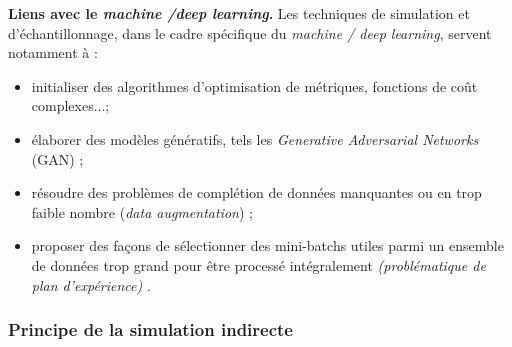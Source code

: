 \begin{remark}{\bf Liens avec le \emph{machine /deep learning}.}
Les techniques de simulation et d'échantillonnage, dans le cadre spécifique du {\it machine / deep learning}, servent notamment  à : 
\begin{itemize}
\item initialiser des algorithmes d'optimisation de métriques, fonctions de coût complexes...; 
\item élaborer des {modèles génératifs}, tels les {\it Generative Adversarial Networks} (GAN) ; 
\item résoudre des problèmes de complétion de données manquantes ou en trop faible nombre ({\it data augmentation}) ; 
\item proposer des fa\c cons de sélectionner des mini-batchs utiles parmi un ensemble de données trop grand pour être processé intégralement {\it (problématique de plan d'expérience)} .
\end{itemize}

\end{remark}







\subsubsection{Principe de la simulation indirecte}

